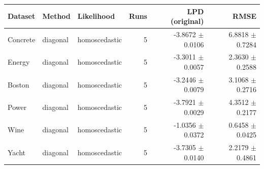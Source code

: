 \begin{tabular}{lllrrr}
\toprule
Dataset & Method & Likelihood & Runs & LPD (original) & RMSE \\
\midrule
Concrete & diagonal & homoscedastic & 5 & -3.8672 $\pm$ 0.0106 & 6.8818 $\pm$ 0.7284 \\
Energy & diagonal & homoscedastic & 5 & -3.3011 $\pm$ 0.0057 & 2.3630 $\pm$ 0.2588 \\
Boston & diagonal & homoscedastic & 5 & -3.2446 $\pm$ 0.0079 & 3.1068 $\pm$ 0.2716 \\
Power & diagonal & homoscedastic & 5 & -3.7921 $\pm$ 0.0029 & 4.3512 $\pm$ 0.2177 \\
Wine & diagonal & homoscedastic & 5 & -1.0356 $\pm$ 0.0372 & 0.6458 $\pm$ 0.0425 \\
Yacht & diagonal & homoscedastic & 5 & -3.7305 $\pm$ 0.0140 & 2.2179 $\pm$ 0.4861 \\
\bottomrule
\end{tabular}
